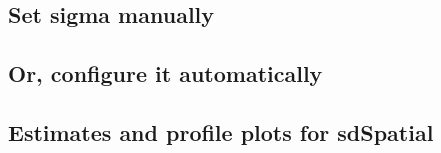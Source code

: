 \documentclass[
]{article}
\newenvironment{Shaded}{\begin{snugshade}}{\end{snugshade}}
\newcommand{\AttributeTok}[1]{\textcolor[rgb]{0.13,0.29,0.53}{#1}}
\newcommand{\CommentTok}[1]{\textcolor[rgb]{0.56,0.35,0.01}{\textit{#1}}}
\newcommand{\DecValTok}[1]{\textcolor[rgb]{0.00,0.00,0.81}{#1}}
\newcommand{\ErrorTok}[1]{\textcolor[rgb]{0.64,0.00,0.00}{\textbf{#1}}}
\newcommand{\FloatTok}[1]{\textcolor[rgb]{0.00,0.00,0.81}{#1}}
\newcommand{\FunctionTok}[1]{\textcolor[rgb]{0.13,0.29,0.53}{\textbf{#1}}}
\newcommand{\NormalTok}[1]{#1}
\newcommand{\OtherTok}[1]{\textcolor[rgb]{0.56,0.35,0.01}{#1}}
\newcommand{\SpecialCharTok}[1]{\textcolor[rgb]{0.81,0.36,0.00}{\textbf{#1}}}
\newcommand{\StringTok}[1]{\textcolor[rgb]{0.31,0.60,0.02}{#1}}
\begin{document}
\hypertarget{set-sigma-manually}{%
\subsection{Set sigma manually}\label{set-sigma-manually}}

\begin{Shaded}
\end{Shaded}

\hypertarget{or-configure-it-automatically}{%
\subsection{Or, configure it
automatically}\label{or-configure-it-automatically}}

\begin{Shaded}
\end{Shaded}

\hypertarget{estimates-and-profile-plots-for-sdspatial}{%
\subsection{Estimates and profile plots for
sdSpatial}\label{estimates-and-profile-plots-for-sdspatial}}
\end{document}
